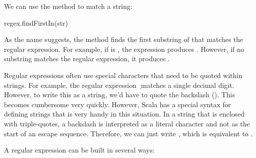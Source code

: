 We can use the  method to match a string:
\begin{scalacode}
regex.findFirstIn(str)
\end{scalacode}
As the name suggests, the method finds the first substring of  that matches the regular expression. For example, if  is , the expression produces . However, if no substring matches the regular expression, it produces .

\begin{notation}
Regular expressions often use special characters that need to be quoted within strings. For example, the regular expression \texttt{\d} matches a single decimal digit. However, to write this as a string, we'd have to quote the backslash (). This becomes cumbersome very quickly. However, Scala has a special syntax for defining strings that is very handy in this situation. In a  string that is enclosed with triple-quotes, a backslash is interpreted as a literal character and not as the start of an escape sequence. Therefore, we can just write , which is equivalent to .
\end{notation}

A regular expression can be built in several ways:

